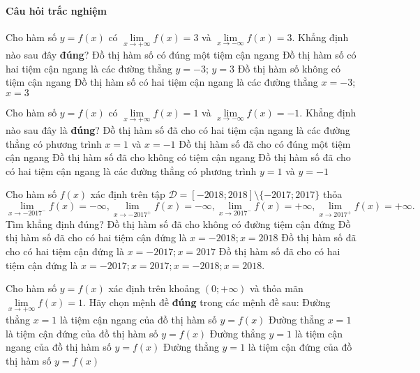 \paragraph{Câu hỏi trắc nghiệm}
\begin{ex}%
	Cho hàm số $y=f(x)$ có $\lim\limits_{x\to+\infty} f(x)=3$ và $\lim\limits_{x\to-\infty} f(x)=3$. Khẳng định nào sau đây \textbf{đúng}?
	\choice
	{\True Đồ thị hàm số có đúng một tiệm cận ngang}
	{Đồ thị hàm số có hai tiệm cận ngang là các đường thẳng $y=-3$; $y=3$}
	{Đồ thị hàm số không có tiệm cận ngang}
	{Đồ thị hàm số có hai tiệm cận ngang là các đường thẳng $x=-3$; $x=3$}
\end{ex}
\begin{ex}%
	Cho hàm số $y=f(x)$ có $\lim\limits_{x\to+\infty} f(x)=1$ và $\lim\limits_{x\to-\infty} f(x)=-1$. Khẳng định nào sau đây là \textbf{đúng}?
	\choice
	{Đồ thị hàm số đã cho có hai tiệm cận ngang là các đường thẳng có phương trình $x=1$ và $x=-1$}
	{Đồ thị hàm số đã cho có đúng một tiệm cận ngang}
	{Đồ thị hàm số đã cho không có tiệm cận ngang}
	{\True Đồ thị hàm số đã cho có hai tiệm cận ngang là các đường thẳng có phương trình $y=1$ và $y=-1$}
\end{ex}
\begin{ex}%
	Cho hàm số $f(x)$ xác định trên tập $\mathscr{D}=[-2018;2018]\setminus\{-2017;2017\}$ thỏa
	$$\lim\limits_{x\to-{2017}^-} f(x)=-\infty, \lim\limits_{x\to-{2017}^+} f(x)=-\infty, \lim\limits_{x\to{2017}^-} f(x)=+\infty, \lim\limits_{x\to{2017}^+} f(x)=+\infty.$$
	Tìm khẳng định đúng?
	\choice
	{Đồ thị hàm số đã cho không có đường tiệm cận đứng}
	{Đồ thị hàm số đã cho có hai tiệm cận đứng là $x=-2018;x=2018$}
	{\True Đồ thị hàm số đã cho có hai tiệm cận đứng là $x=-2017;x=2017$}
	{Đồ thị hàm số đã cho có hai tiệm cận đứng là $x=-2017;x=2017;x=-2018;x=2018$.}
\end{ex}
\begin{ex}%
	Cho hàm số $y=f(x)$ xác định trên khoảng $(0;+\infty)$ và thỏa mãn $\lim\limits_{x\to+\infty} f(x)=1$. Hãy chọn mệnh đề \textbf{đúng} trong các mệnh đề sau: 
	\choice
	{Đường thẳng $x=1$ là tiệm cận ngang của đồ thị hàm số $y=f(x)$}
	{Đường thẳng $x=1$ là tiệm cận đứng của đồ thị hàm số $y=f(x)$}
	{\True Đường thẳng $y=1$ là tiệm cận ngang của đồ thị hàm số $y=f(x)$}
	{Đường thẳng $y=1$ là tiệm cận đứng của đồ thị hàm số $y=f(x)$}
\end{ex}
